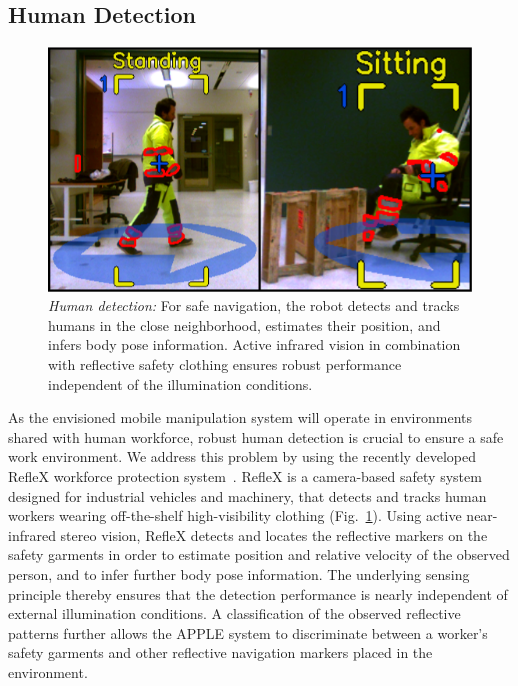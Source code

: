 \subsection{Human Detection}
\label{subsec:people_det}
%
\begin{figure}[t!]
  \begin{center}
    \includegraphics[width =0.99\linewidth]{figs/person_detection}
    \caption{\textit{Human detection:} For safe navigation, the robot detects and tracks humans in
      the close neighborhood, estimates their position, and infers body pose information. Active
      infrared vision in combination with reflective safety clothing ensures robust performance
      independent of the illumination conditions.}
    \label{fig:people_det}
    \vspace{-0.55cm}
  \end{center}
\end{figure}
% 
As the envisioned mobile manipulation system will operate in environments shared with human
workforce, robust human detection is crucial to ensure a safe work environment. We address this
problem by using the recently developed RefleX workforce protection system~\cite{Mosb14}. RefleX is
a camera-based safety system designed for industrial vehicles and machinery, that detects and tracks
human workers wearing off-the-shelf high-visibility clothing (Fig.~\ref{fig:people_det}). Using
active near-infrared stereo vision, RefleX detects and locates the reflective markers on the safety
garments in order to estimate position and relative velocity of the observed person, and to infer
further body pose information. The underlying sensing principle thereby ensures that the detection
performance is nearly independent of external illumination conditions. A classification of the
observed reflective patterns further allows the APPLE system to discriminate between a worker's
safety garments and other reflective navigation markers placed in the environment.
